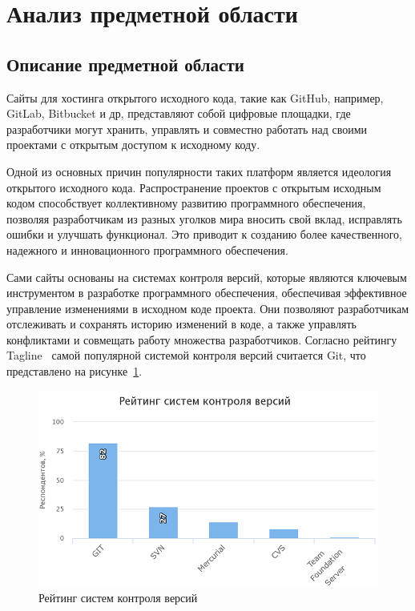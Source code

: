 \newpage
\section{Анализ предметной области}
\label{sec:Background}
\subsection{Описание предметной области}
\label{subsec:Description}

Сайты для хостинга открытого исходного кода, такие как GitHub, например, GitLab, Bitbucket и др, представляют собой цифровые площадки, где разработчики могут хранить, управлять и совместно работать над своими проектами с открытым доступом к исходному коду.

Одной из основных причин популярности таких платформ является идеология открытого исходного кода. Распространение проектов с открытым исходным кодом способствует коллективному развитию программного обеспечения, позволяя разработчикам из разных уголков мира вносить свой вклад, исправлять ошибки и улучшать функционал. Это приводит к созданию более качественного, надежного и инновационного программного обеспечения.

Сами сайты основаны на системах контроля версий, которые являются ключевым инструментом в разработке программного обеспечения, обеспечивая эффективное управление изменениями в исходном коде проекта. Они позволяют разработчикам отслеживать и сохранять историю изменений в коде, а также управлять конфликтами и совмещать работу множества разработчиков. Согласно рейтингу Tagline~\cite{SCVRating} самой популярной системой контроля версий считается Git, что представлено на рисунке~\ref{ris:scvrating}.

\begin{figure}[h]
    \centering
    \includegraphics[width=0.9\linewidth]{pic/scvrating.png}
    \vspace{1em}
    \caption{Рейтинг систем контроля версий}
    \label{ris:scvrating}
\end{figure}
\vspace{1em}

